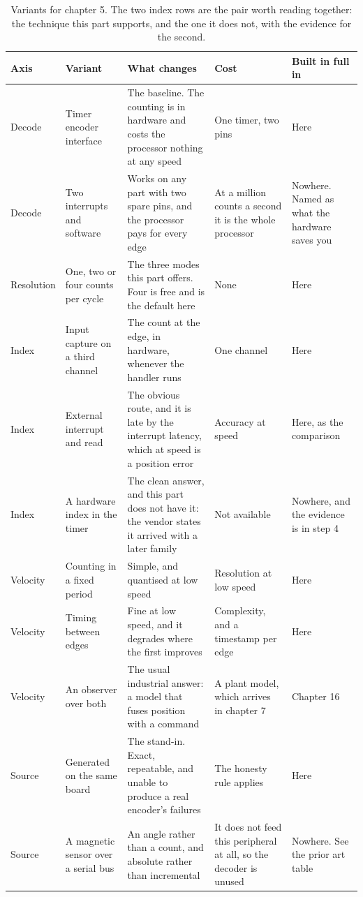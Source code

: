 \begin{table}[H]\centering\small
\begin{tabular}{p{24mm}p{26mm}p{44mm}p{22mm}p{20mm}}
\toprule
Axis & Variant & What changes & Cost & Built in full in \\
\midrule
Decode & Timer encoder interface & The baseline. The counting is in hardware and costs the processor nothing at any speed & One timer, two pins & Here \\
Decode & Two interrupts and software & Works on any part with two spare pins, and the processor pays for every edge & At a million counts a second it is the whole processor & Nowhere. Named as what the hardware saves you \\
Resolution & One, two or four counts per cycle & The three modes this part offers. Four is free and is the default here & None & Here \\
Index & Input capture on a third channel & The count at the edge, in hardware, whenever the handler runs & One channel & Here \\
Index & External interrupt and read & The obvious route, and it is late by the interrupt latency, which at speed is a position error & Accuracy at speed & Here, as the comparison \\
Index & A hardware index in the timer & The clean answer, and this part does not have it: the vendor states it arrived with a later family & Not available & Nowhere, and the evidence is in step 4 \\
Velocity & Counting in a fixed period & Simple, and quantised at low speed & Resolution at low speed & Here \\
Velocity & Timing between edges & Fine at low speed, and it degrades where the first improves & Complexity, and a timestamp per edge & Here \\
Velocity & An observer over both & The usual industrial answer: a model that fuses position with a command & A plant model, which arrives in chapter 7 & Chapter 16 \\
Source & Generated on the same board & The stand-in. Exact, repeatable, and unable to produce a real encoder's failures & The honesty rule applies & Here \\
Source & A magnetic sensor over a serial bus & An angle rather than a count, and absolute rather than incremental & It does not feed this peripheral at all, so the decoder is unused & Nowhere. See the prior art table \\
\bottomrule
\end{tabular}
\caption{Variants for chapter 5. The two index rows are the pair worth reading together: the technique this part supports, and the one it does not, with the evidence for the second.}
\end{table}

